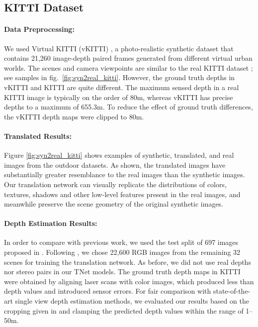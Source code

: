 \documentclass[runningheads]{llncs}
\begin{document}
\subsection{KITTI Dataset}

\paragraph{\bf Data Preprocessing:} We used Virtual KITTI (vKITTI) \cite{gaidon2016virtualworlds}, a photo-realistic synthetic dataset that contains 21,260 image-depth paired frames generated from different virtual urban worlds. The scenes and camera viewpoints are similar to the real KITTI dataset \cite{Menze2015CVPR}; see samples in fig.~\ref{fig:syn2real_kitti}. However, the ground truth depths in vKITTI and KITTI are quite different. The maximum sensed depth in a real KITTI image is typically on the order of 80m, whereas vKITTI has precise depths to a maximum of 655.3m. To reduce the effect of ground truth differences, the vKITTI depth maps were clipped to 80m.

\paragraph{\bf Translated Results:} Figure \ref{fig:syn2real_kitti} shows examples of synthetic, translated, and real images from the outdoor datasets. As shown, the translated images have substantially greater resemblance to the real images than the synthetic images. Our translation network can visually replicate the distributions of colors, textures, shadows and other low-level features present in the real images, and meanwhile preserve the scene geometry of the original synthetic images.


\paragraph{\bf Depth Estimation Results:} In order to compare with previous work, we used the test split of 697 images proposed in \cite{eigen2014depth}. Following \cite{godard2017unsupervised}, we chose 22,600 RGB images from the remaining 32 scenes for training the translation network. As before, we did not use real depths nor stereo pairs in our TNet models. The ground truth depth maps in KITTI were obtained by aligning laser scans with color images, which produced less than  depth values and introduced sensor errors. For fair comparison with state-of-the-art single view depth estimation methods, we evaluated our results based on the cropping given in \cite{garg2016unsupervised} and clamping the predicted depth values within the range of 1--50m.
\end{document}
